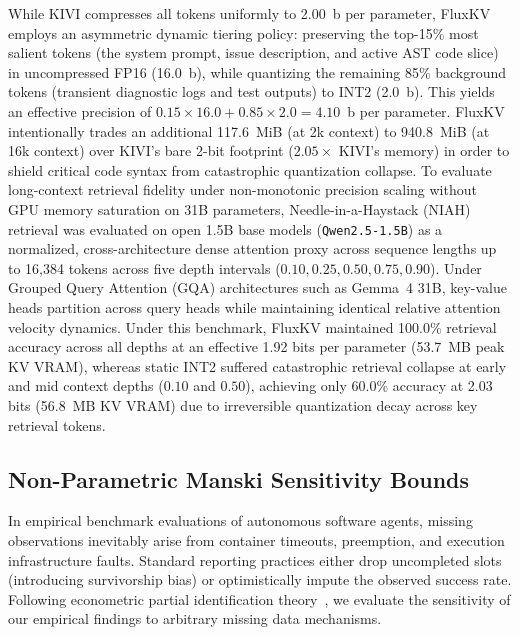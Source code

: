 \documentclass[10pt,twocolumn]{article}
\begin{document}
While KIVI compresses all tokens uniformly to 2.00~b per parameter, FluxKV employs an asymmetric dynamic tiering policy: preserving the top-15\% most salient tokens (the system prompt, issue description, and active AST code slice) in uncompressed FP16 (16.0~b), while quantizing the remaining 85\% background tokens (transient diagnostic logs and test outputs) to INT2 (2.0~b). This yields an effective precision of $0.15 \times 16.0 + 0.85 \times 2.0 = 4.10$~b per parameter. FluxKV intentionally trades an additional 117.6~MiB (at 2k context) to 940.8~MiB (at 16k context) over KIVI's bare 2-bit footprint ($2.05\times$ KIVI's memory) in order to shield critical code syntax from catastrophic quantization collapse. To evaluate long-context retrieval fidelity under non-monotonic precision scaling without GPU memory saturation on 31B parameters, Needle-in-a-Haystack (NIAH) retrieval was evaluated on open 1.5B base models (\texttt{Qwen2.5-1.5B}) as a normalized, cross-architecture dense attention proxy across sequence lengths up to 16,384 tokens across five depth intervals ($0.10, 0.25, 0.50, 0.75, 0.90$). Under Grouped Query Attention (GQA) architectures such as Gemma~4 31B, key-value heads partition across query heads while maintaining identical relative attention velocity dynamics. Under this benchmark, FluxKV maintained 100.0\% retrieval accuracy across all depths at an effective 1.92 bits per parameter (53.7~MB peak KV VRAM), whereas static INT2 suffered catastrophic retrieval collapse at early and mid context depths ($0.10$ and $0.50$), achieving only 60.0\% accuracy at 2.03 bits (56.8~MB KV VRAM) due to irreversible quantization decay across key retrieval tokens.

\subsection{Non-Parametric Manski Sensitivity Bounds}
In empirical benchmark evaluations of autonomous software agents, missing observations inevitably arise from container timeouts, preemption, and execution infrastructure faults. Standard reporting practices either drop uncompleted slots (introducing survivorship bias) or optimistically impute the observed success rate. Following econometric partial identification theory~\cite{manski1989,manski2003}, we evaluate the sensitivity of our empirical findings to arbitrary missing data mechanisms.
\end{document}
